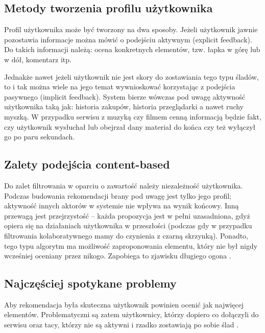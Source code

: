 \documentclass[twoside]{iisthesis}
\begin{document}
	 \subsection{Metody tworzenia profilu użytkownika}
	 
	 Profil użytkownika może być tworzony na dwa sposoby. Jeżeli użytkownik jawnie pozostawia informacje można mówić o podejściu aktywnym (explicit feedback). Do takich informacji należą: ocena konkretnych elementów, tzw. łapka w górę lub w dół, komentarz itp. 
	 
	 Jednakże nawet jeżeli użytkownik nie jest skory do zostawiania tego typu śladów, to i tak można wiele na jego temat wywnioskować korzystając z podejścia pasywnego (implicit feedback). System bierze wówczas pod uwagę aktywność użytkownika taką jak: historia zakupów, historia przeglądarki a nawet ruchy myszką. W przypadku serwisu z muzyką czy filmem cenną informacją będzie fakt, czy użytkownik wysłuchał lub obejrzał dany materiał do końca czy też wyłączył go po paru sekundach. \cite{id:ContentBasedRecommenderSystemsState}\cite{id:AdvancesInCollaborativeFiltering}
	 
	 \subsection{Zalety podejścia content-based}
	 
	 Do zalet filtrowania w oparciu o zawartość należy niezależność użytkownika. Podczas budowania rekomendacji brany pod uwagę jest tylko jego profil; aktywność innych aktorów w systemie nie wpływa na wynik końcowy. Inną przewagą jest przejrzystość -- każda propozycja jest w pełni uzasadniona, gdyż opiera się na działaniach użytkownika w przeszłości (podczas gdy w przypadku filtrowania kolaboratywnego mamy do czynienia z czarną skrzynką). Ponadto, tego typu algorytm ma możliwość zaproponowania elementu, który nie był nigdy wcześniej oceniany przez nikogo. Zapobiega to zjawisku długiego ogona	 \cite{id:ContentBasedRecommenderSystemsState}.
	 
	 \subsection{Najczęściej spotykane problemy}
	 Aby rekomendacja była skuteczna użytkownik powinien ocenić jak najwięcej elementów. Problematyczni są zatem użytkownicy, którzy dopiero co dołączyli do serwisu oraz tacy, którzy nie są aktywni i rzadko zostawiają po sobie ślad 	 \cite{id:MaleszkaMianowskaNguyenmethod}.
	 
\end{document}
